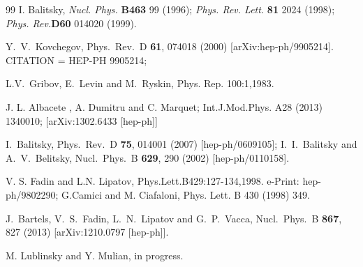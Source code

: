 \documentclass[11pt,a4paper]{article}
\begin{document}
\begin{thebibliography}{99}
I. Balitsky, {\it Nucl. Phys.}  {\bf B463} 99 (1996); 
{\it Phys. Rev. Lett.} {\bf 81} 2024 (1998); %
{\it Phys. Rev.}{\bf D60} 014020 (1999).

  Y.~V.~Kovchegov,
  Phys.\ Rev.\ D {\bf 61}, 074018 (2000)
  [arXiv:hep-ph/9905214].
  CITATION = HEP-PH 9905214;%


  L.V.~Gribov, E.~Levin and M.~Ryskin, Phys. Rep.
100:1,1983.

 J. L. Albacete ,  A. Dumitru and C. Marquet; Int.J.Mod.Phys. A28 (2013) 1340010; [arXiv:1302.6433 [hep-ph]]
 

  I.~Balitsky,
  Phys.\ Rev.\ D {\bf 75}, 014001 (2007)
  [hep-ph/0609105];
          I.~I.~Balitsky and A.~V.~Belitsky,
  Nucl.\ Phys.\ B {\bf 629}, 290 (2002)
  [hep-ph/0110158].
  
 V. S. Fadin  and L.N. Lipatov, Phys.Lett.B429:127-134,1998.
e-Print: hep-ph/9802290;
G.Camici and M. Ciafaloni, Phys. Lett. B 430 (1998) 349.

 
               
  J.~Bartels, V.~S.~Fadin, L.~N.~Lipatov and G.~P.~Vacca,
  Nucl.\ Phys.\ B {\bf 867}, 827 (2013)
  [arXiv:1210.0797 [hep-ph]].
  
 M. Lublinsky and Y. Mulian,  in progress.
               
 

\end{thebibliography}
\end{document}
